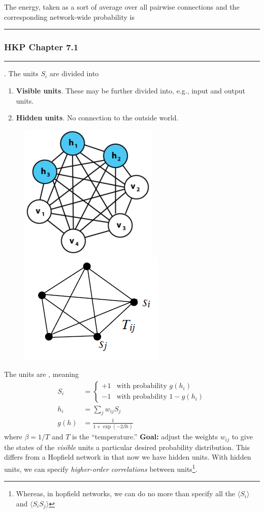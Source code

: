 \documentclass[12pt]{article}
\begin{document}
The energy, taken as a sort of average over all pairwise connections and the corresponding network-wide probability is

\myspace
\hrule
\subsubsection{HKP Chapter 7.1}
\hrule
\p {}. The units $S_i$ are divided into 
\begin{enumerate}
	\item \textbf{Visible units}. These may be further divided into, e.g., input and output units.
	\item \textbf{Hidden units}. No connection to the outside world. 
\end{enumerate}
\begin{figure}[h!]
	\centering
	\includegraphics[height=0.15\textwidth]{boltzmann.PNG}
	\includegraphics[height=0.15\textwidth]{boltzmann2.PNG}
\end{figure}

\p The units are , meaning 
\begin{align}
S_i &= 
\begin{cases}
	+1 & \text{with probability } g(h_i) \\
	-1 & \text{with probability } 1 - g(h_i)
\end{cases}\\
h_i &= \sum_j w_{ij} S_j \\
g(h) &= \frac{1}{1 + \exp(-2\beta h)}
\end{align}
where $\beta = 1/T$ and $T$ is the ``temperature.'' \textbf{Goal:} adjust the weights $w_{ij}$ to give the states of the \textit{visible} units a particular desired probability distribution. This differs from a Hopfield network in that now we have hidden units. With hidden units, we can specify \textit{higher-order correlations} between units\footnote{Whereas, in hopfield networks, we can do no more than specify all the $\langle S_i \rangle$ and $\langle S_i S_j \rangle$}. 
\end{document}
